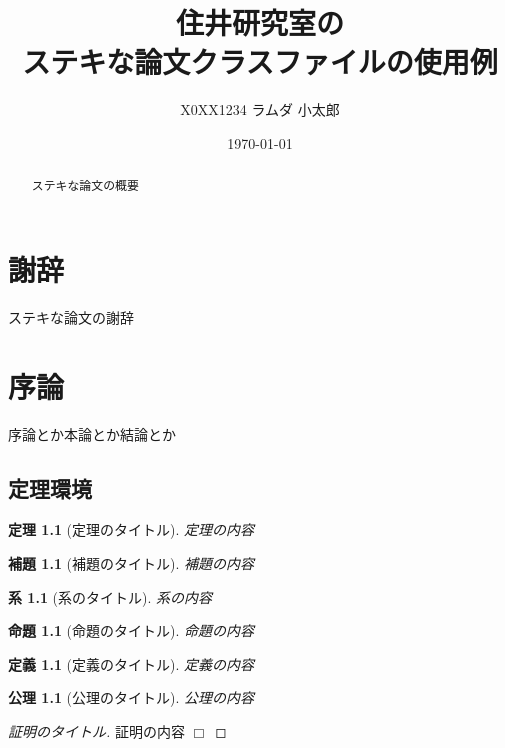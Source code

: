 \documentclass{sumiilab-paper}
\title{住井研究室の\\ステキな論文クラスファイルの使用例}
\author{X0XX1234 ラムダ 小太郎}
\institute{東北大学 工学部\\情報知能システム総合学科}%
\date{\today}
\theoremstyle{break}%
\newtheorem{theorem}{定理}[chapter]
\newtheorem{lemma}{補題}[chapter]
\newtheorem{corollary}{系}[chapter]
\newtheorem{proposition}{命題}[chapter]
\newtheorem{definition}{定義}[chapter]
\newtheorem{axiom}{公理}[chapter]
\newtheorem{proof}{証明}[chapter]
\newcommand{\qed}{\hfill $\Box$}
\begin{document}
\maketitle

\begin{abstract}
ステキな論文の概要
\end{abstract}

\chapter*{謝辞}

ステキな論文の謝辞

\tableofcontents


\chapter{序論}

序論とか本論とか結論とか \cite{TAPL}

\section{定理環境}

\begin{theorem}[定理のタイトル]
  定理の内容
\end{theorem}

\begin{lemma}[補題のタイトル]
  補題の内容
\end{lemma}

\begin{corollary}[系のタイトル]
  系の内容
\end{corollary}

\begin{proposition}[命題のタイトル]
  命題の内容
\end{proposition}

\begin{definition}[定義のタイトル]
  定義の内容
\end{definition}

\begin{axiom}[公理のタイトル]
  公理の内容
\end{axiom}

\begin{proof}[証明のタイトル]
  証明の内容 \qed
\end{proof}
\end{document}
